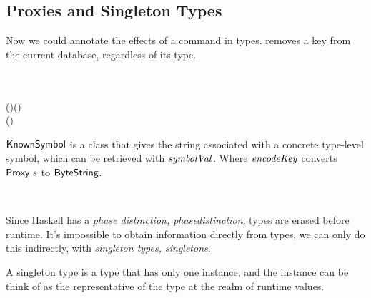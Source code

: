 \subsection{Proxies and Singleton Types}

Now we could annotate the effects of a command in types. 
 removes a key from the current database, regardless of its type.

\begin{hscode}\SaveRestoreHook
{}%
%
%
\>[B]{}\mathbin{::}\;\<[E]%
\\
\>[B]{}\<[5]%
\>[5]{}\Rightarrow {}\;\<[E]%
\\
\>[B]{}\<[5]%
\>[5]{}\to {}\;\;(\;\;)\;(\;\;){}\<[E]%
\\
\>[B]{}\;\mathrel{=}\mathbin{\$}\;(\;){}\<[E]%
\ColumnHook
\end{hscode}\resethooks

\ensuremath{\Conid{KnownSymbol}} is a class that gives the string associated
 with a concrete type-level symbol, which can be retrieved with
 \ensuremath{\Varid{symbolVal}}.\footnotemark
 Where \ensuremath{\Varid{encodeKey}} converts \ensuremath{\Conid{Proxy}\;\Varid{s}} to
 \ensuremath{\Conid{ByteString}}.

\begin{hscode}\SaveRestoreHook
{}%
%
\>[B]{}\mathbin{::}\;\Rightarrow {}\;\to {}\<[E]%
\\
\>[B]{}\mathrel{=}\mathbin{\cdot}\<[E]%
\ColumnHook
\end{hscode}\resethooks

Since Haskell has a \emph{phase distinction, phasedistinction}, types are
 erased before runtime. It's impossible to obtain information directly from
 types, we can only do this indirectly, with
 \emph{singleton types, singletons}.

A singleton type is a type that has only one instance, and the instance can be
 think of as the representative of the type at the realm of runtime values.

